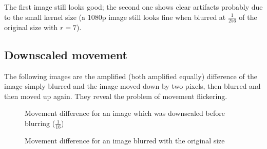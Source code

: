\documentclass[english,fleqn,10pt,twocolumn]{article}
\begin{document}
The first image still looks good; the second one shows clear artifacts probably due to the small kernel size (a 1080p image still looks fine when blurred at $\frac 1{256}$ of the original size
with $r = 7$).

\subsection{Downscaled movement}

The following images are the amplified (both amplified equally) difference of the image simply blurred and the image moved down by two pixels, then blurred and then moved up again. They reveal the
problem of movement flickering.

\begin{figure}[H]
    \centering {}
    \caption{Movement difference for an image which was downscaled before blurring ($\frac 1{16}$)}
\end{figure}

\begin{figure}[H]
    \centering {}
    \caption{Movement difference for an image blurred with the original size}
\end{figure}
\end{document}
